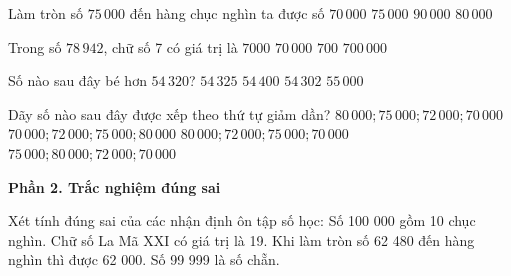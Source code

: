 \begin{ex} %
Làm tròn số $75\,000$ đến hàng chục nghìn ta được số
\choice
{$70\,000$}
{$75\,000$}
{$90\,000$}
{\True $80\,000$}
\end{ex}

\begin{ex} %
Trong số $78\,942$, chữ số 7 có giá trị là
\choice
{$7000$}
{\True $70\,000$}
{$700$}
{$700\,000$}
\end{ex}

\begin{ex} %
Số nào sau đây bé hơn $54\,320$?
\choice
{$54\,325$}
{$54\,400$}
{\True $54\,302$}
{$55\,000$}
\end{ex}

\begin{ex} %
Dãy số nào sau đây được xếp theo thứ tự giảm dần?
\choice
{\True $80\,000; 75\,000; 72\,000; 70\,000$}
{$70\,000; 72\,000; 75\,000; 80\,000$}
{$80\,000; 72\,000; 75\,000; 70\,000$}
{$75\,000; 80\,000; 72\,000; 70\,000$}
\end{ex}

\textbf{Phần 2. Trắc nghiệm đúng sai}

\begin{ex} %
Xét tính đúng sai của các nhận định ôn tập số học:
\choiceTF
{\True Số 100 000 gồm 10 chục nghìn.}
{Chữ số La Mã XXI có giá trị là 19.}
{\True Khi làm tròn số 62 480 đến hàng nghìn thì được 62 000.}
{Số 99 999 là số chẵn.}
\end{ex}

